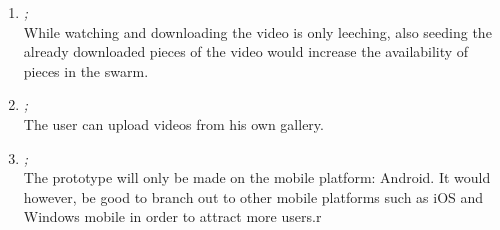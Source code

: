 \begin{enumerate}
\item \emph{;}\\
While watching and downloading the video is only leeching, also seeding the already downloaded pieces of the video would increase the availability of pieces in the swarm.

\item \emph{;}\\
The user can upload videos from his own gallery.

\item \emph{;}\\
The prototype will only be made on the mobile platform: Android. It would however, be good to branch out to other mobile platforms such as iOS and Windows mobile in order to attract more users.r

\end{enumerate}

